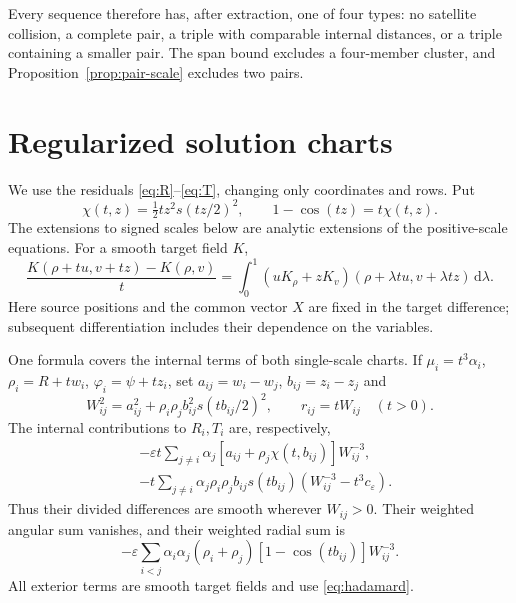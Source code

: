 \documentclass[11pt,a4paper]{article}
\numberwithin{equation}{section}
\theoremstyle{remark}
\newcommand{\eps}{\varepsilon}
\newcommand{\dd}{\,\mathrm d}
\begin{document}
Every sequence therefore has, after extraction, one of four types: no satellite collision, a complete pair, a triple with comparable internal distances, or a triple containing a smaller pair. The span bound excludes a four-member cluster, and Proposition~\ref{prop:pair-scale} excludes two pairs.

\section{Regularized solution charts}
\label{sec:charts}
We use the residuals \eqref{eq:R}--\eqref{eq:T}, changing only coordinates and rows. Put
\begin{equation}\label{eq:chi}
 \chi(t,z)=\tfrac12tz^2s(tz/2)^2,\qquad 1-\cos(tz)=t\chi(t,z).
\end{equation}
The extensions to signed scales below are analytic extensions of the positive-scale equations. For a smooth target field $K$,
\begin{equation}\label{eq:hadamard}
 \frac{K(\rho+tu,v+tz)-K(\rho,v)}t
 =\int_0^1(uK_\rho+zK_v)(\rho+\lambda tu,v+\lambda tz)\dd\lambda.
\end{equation}
Here source positions and the common vector $X$ are fixed in the target difference; subsequent differentiation includes their dependence on the variables.

One formula covers the internal terms of both single-scale charts. If $\mu_i=t^3\alpha_i$, $\rho_i=R+tw_i$, $\varphi_i=\psi+tz_i$, set $a_{ij}=w_i-w_j$, $b_{ij}=z_i-z_j$ and
\[
 W_{ij}^2=a_{ij}^2+\rho_i\rho_jb_{ij}^2s(tb_{ij}/2)^2,
 \qquad r_{ij}=tW_{ij}\quad(t>0).
\]
The internal contributions to $R_i,T_i$ are, respectively,
\begin{equation}\label{eq:regular-int}
 \begin{aligned}
 &-\eps t\sum_{j\ne i}\alpha_j[a_{ij}+\rho_j\chi(t,b_{ij})]W_{ij}^{-3},\\
 &-t\sum_{j\ne i}\alpha_j\rho_i\rho_jb_{ij}s(tb_{ij})(W_{ij}^{-3}-t^3c_\eps).
 \end{aligned}
\end{equation}
Thus their divided differences are smooth wherever $W_{ij}>0$. Their weighted angular sum vanishes, and their weighted radial sum is
\[
 -\eps\sum_{i<j}\alpha_i\alpha_j(\rho_i+\rho_j)
 [1-\cos(tb_{ij})]W_{ij}^{-3}.
\]
All exterior terms are smooth target fields and use \eqref{eq:hadamard}.
\end{document}
